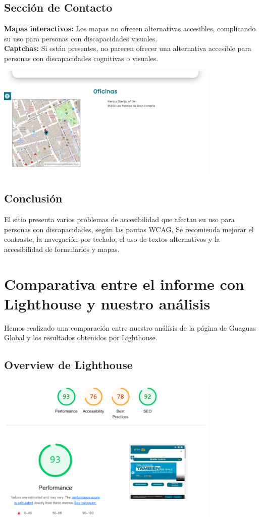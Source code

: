 \documentclass[a4paper,12pt]{article}
\begin{document}
\subsection{Sección de Contacto}
\textbf{Mapas interactivos:} Los mapas no ofrecen alternativas accesibles, complicando su uso para personas con discapacidades visuales.\\
\textbf{Captchas:} Si están presentes, no parecen ofrecer una alternativa accesible para personas con discapacidades cognitivas o visuales.

\vspace{0.3cm}
\includegraphics[width=0.8\textwidth]{Images/global_contacto.png}

\vspace{-0.5cm}
\subsection{Conclusión}
El sitio presenta varios problemas de accesibilidad que afectan su uso para personas con discapacidades, según las pautas WCAG. Se recomienda mejorar el contraste, la navegación por teclado, el uso de textos alternativos y la accesibilidad de formularios y mapas.

\newpage

\section{Comparativa entre el informe con Lighthouse y nuestro análisis}
Hemos realizado una comparación entre nuestro análisis de la página de Guaguas Global y los resultados obtenidos por Lighthouse.

\subsection{Overview de Lighthouse}

\vspace{0.3cm}
\includegraphics[width=0.8\textwidth]{Images/overview_lighthouse.png}
\end{document}
